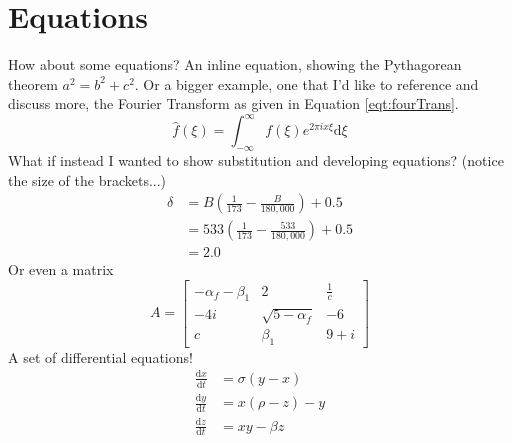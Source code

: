 \documentclass[titlepage, hidelinks, 12pt]{article}%
\begin{document}
    \section{Equations}
        How about some equations? An inline equation, showing the Pythagorean theorem \(a^{2} = b^{2} + c^{2}\).
        Or a bigger example, one that I'd like to reference and discuss more, the Fourier Transform as given in Equation \ref{eqt:fourTrans}.
        \begin{equation}
            \hat{f}\left(\xi\right) = \int_{-\infty}^{\infty}f\left(\xi\right)e^{2\pi ix\xi}\text{d}\xi
            \label{eqt:fourTrans}
        \end{equation}
        What if instead I wanted to show substitution and developing equations? (notice the size of the brackets...)
        \begin{align}
            \delta & = B\left(\frac{1}{173} - \frac{B}{180,000}\right) + 0.5\nonumber      \\
                   & = 533\left(\frac{1}{173} - \frac{533}{180,000}\right) + 0.5 \nonumber \\
                   & = 2.0 \nonumber
        \end{align}
        Or even a matrix
        \begin{equation*}
            A =
            \begin{bmatrix}
                -\alpha_f-\beta_1 & 2                 & \frac{1}{c} \\
                -4i               & \sqrt{5-\alpha_f} & -6          \\
                c                 & \beta_1           & 9 + i
            \end{bmatrix}
        \end{equation*}
        A set of differential equations!
        \begin{align}
            \frac{\text{d}x}{\text{d}t} &= \sigma (y-x)\\
            \frac{\text{d}y}{\text{d}t} &= x(\rho -z)-y\\
            \frac{\text{d}z}{\text{d}t} &= xy-\beta z
        \end{align}


    \clearpage
\end{document}
